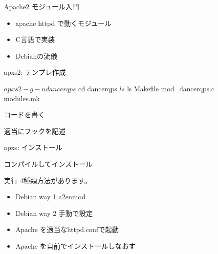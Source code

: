
{\footnotesize
 
}


\begin{frame}{Apache2 モジュール入門}
\begin{itemize}
 \item apache httpd で動くモジュール
 \item C言語で実装
 \item Debianの流儀
\end{itemize} 
\end{frame}

\begin{frame}[containsverbatim]{apxs2: テンプレ作成}
\begin{commandline}
$ apxs2 -g -n dancerqps
$ cd dancerqps
$ ls 
$ ls
Makefile  mod_dancerqps.c  modules.mk
\end{commandline}
\end{frame}

\begin{frame}{コードを書く}
 
適当にフックを記述

\end{frame}

\begin{frame}[containsverbatim]{apxs: インストール}

コンパイルしてインストール
\end{frame}

\begin{frame}{実行}
 4種類方法があります。
\begin{itemize}
 \item Debian way 1 a2enmod
 \item Debian way 2 手動で設定
 \item Apache を適当なhttpd.confで起動
 \item Apache を自前でインストールしなおす　
\end{itemize}
\end{frame}

